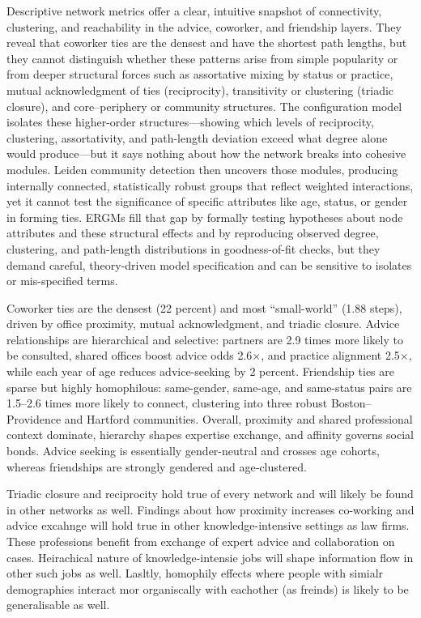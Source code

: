 \documentclass[
]{article}
\begin{document}
Descriptive network metrics offer a clear, intuitive snapshot of
connectivity, clustering, and reachability in the advice, coworker, and
friendship layers. They reveal that coworker ties are the densest and
have the shortest path lengths, but they cannot distinguish whether
these patterns arise from simple popularity or from deeper structural
forces such as assortative mixing by status or practice, mutual
acknowledgment of ties (reciprocity), transitivity or clustering
(triadic closure), and core--periphery or community structures. The
configuration model isolates these higher-order structures---showing
which levels of reciprocity, clustering, assortativity, and path-length
deviation exceed what degree alone would produce---but it says nothing
about how the network breaks into cohesive modules. Leiden community
detection then uncovers those modules, producing internally connected,
statistically robust groups that reflect weighted interactions, yet it
cannot test the significance of specific attributes like age, status, or
gender in forming ties. ERGMs fill that gap by formally testing
hypotheses about node attributes and these structural effects and by
reproducing observed degree, clustering, and path-length distributions
in goodness-of-fit checks, but they demand careful, theory-driven model
specification and can be sensitive to isolates or mis-specified terms.

Coworker ties are the densest (22 percent) and most ``small-world''
(1.88 steps), driven by office proximity, mutual acknowledgment, and
triadic closure. Advice relationships are hierarchical and selective:
partners are 2.9 times more likely to be consulted, shared offices boost
advice odds 2.6×, and practice alignment 2.5×, while each year of age
reduces advice-seeking by 2 percent. Friendship ties are sparse but
highly homophilous: same-gender, same-age, and same-status pairs are
1.5--2.6 times more likely to connect, clustering into three robust
Boston--Providence and Hartford communities. Overall, proximity and
shared professional context dominate, hierarchy shapes expertise
exchange, and affinity governs social bonds. Advice seeking is
essentially gender-neutral and crosses age cohorts, whereas friendships
are strongly gendered and age‐clustered.

Triadic closure and reciprocity hold true of every network and will
likely be found in other networks as well. Findings about how proximity
increases co-working and advice excahnge will hold true in other
knowledge-intensive settings as law firms. These professions benefit
from exchange of expert advice and collaboration on cases. Heirachical
nature of knowledge-intensie jobs will shape information flow in other
such jobs as well. Lasltly, homophily effects where people with simialr
demographies interact mor organiscally with eachother (as freinds) is
likely to be generalisable as well.
\end{document}
